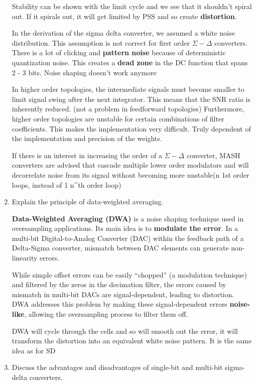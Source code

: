 \documentclass[
  a4paper,
]{article}
\begin{document}
\begin{enumerate}
  Stability can be shown with the limit cycle and we see that it
  shouldn't spiral out. If it spirals out, it will get limited by PSS
  and so create \textbf{distortion}.

  In the derivation of the sigma delta converter, we assumed a white
  noise distribution. This assumption is not correct for first order
  \(\Sigma - \Delta\) converters. There is a lot of clicking and
  \textbf{pattern noise} because of deterministic quantization noise.
  This creates a \textbf{dead zone} in the DC function that spans 2 - 3
  bits. Noise shaping doesn't work anymore

  In higher order topologies, the intermediate signals must become
  smaller to limit signal swing after the next integrator. This means
  that the SNR ratio is inherently reduced. (not a problem in
  feedforward topologies) Furthermore, higher order topologies are
  unstable for certain combinations of filter coefficients. This makes
  the implementation very difficult. Truly dependent of the
  implementation and precision of the weights.

  If there is an interest in increasing the order of a
  \(\Sigma - \Delta\) converter, MASH converters are advised that
  cascade multiple lower order modulators and will decorrelate noise
  from its signal without becoming more unstable(n 1st order loops,
  instead of 1 n\^{}th order loop)
\item
  Explain the principle of data-weighted averaging.

  \textbf{Data-Weighted Averaging (DWA)} is a noise shaping technique
  used in oversampling applications. Its main idea is to
  \textbf{modulate the error}. In a multi-bit Digital-to-Analog
  Converter (DAC) within the feedback path of a Delta-Sigma converter,
  mismatch between DAC elements can generate non-linearity errors.

  While simple offset errors can be easily ``chopped'' (a modulation
  technique) and filtered by the zeros in the decimation filter, the
  errors caused by mismatch in multi-bit DACs are signal-dependent,
  leading to distortion. DWA addresses this problem by making these
  signal-dependent errors \textbf{noise-like}, allowing the oversampling
  process to filter them off.

  DWA will cycle through the cells and so will smooth out the error, it
  will transform the distortion into an equivalent white noise pattern.
  It is the same idea as for SD
\item
  Discuss the advantages and disadvantages of single-bit and multi-bit
  sigma-delta converters.


\end{enumerate}
\end{document}
